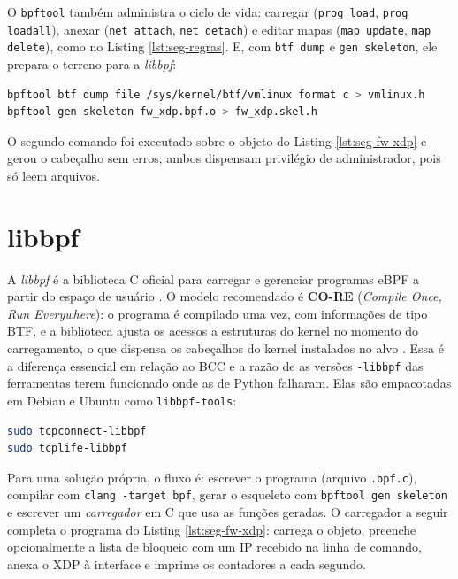 O \texttt{bpftool} também administra o ciclo de vida: carregar (\texttt{prog load},
\texttt{prog loadall}), anexar (\texttt{net attach}, \texttt{net detach}) e editar mapas
(\texttt{map update}, \texttt{map delete}), como no Listing \ref{lst:seg-regras}. E,
com \texttt{btf dump} e \texttt{gen skeleton}, ele prepara o terreno para a \textit{libbpf}:

\begin{lstlisting}[language=bash, caption={Geração de vmlinux.h e do esqueleto (skeleton) com bpftool.}, label=lst:ferr-bpftool-gen]
bpftool btf dump file /sys/kernel/btf/vmlinux format c > vmlinux.h
bpftool gen skeleton fw_xdp.bpf.o > fw_xdp.skel.h
\end{lstlisting}

O segundo comando foi executado sobre o objeto do Listing \ref{lst:seg-fw-xdp} e
gerou o cabeçalho sem erros; ambos dispensam privilégio de administrador, pois só
leem arquivos.

\section{libbpf}

A \textit{libbpf} é a biblioteca C oficial para carregar e gerenciar programas eBPF a
partir do espaço de usuário \cite{libbpf, nakryiko2020}. O modelo recomendado é
\textbf{CO-RE} (\textit{Compile Once, Run Everywhere}): o programa é compilado uma vez,
com informações de tipo BTF, e a biblioteca ajusta os acessos a estruturas do kernel
no momento do carregamento, o que dispensa os cabeçalhos do kernel instalados no alvo
\cite{nakryiko2020}. Essa é a diferença essencial em relação ao BCC e a razão de as
versões \texttt{-libbpf} das ferramentas terem funcionado onde as de Python
falharam. Elas são empacotadas em Debian e Ubuntu como \texttt{libbpf-tools}:

\begin{lstlisting}[language=bash, caption={Ferramentas de rede da libbpf-tools.}, label=lst:ferr-libbpf-tools]
sudo tcpconnect-libbpf
sudo tcplife-libbpf
\end{lstlisting}

Para uma solução própria, o fluxo é: escrever o programa (arquivo \texttt{.bpf.c}),
compilar com \texttt{clang -target bpf}, gerar o esqueleto com \texttt{bpftool gen
skeleton} e escrever um \textit{carregador} em C que usa as funções geradas. O
carregador a seguir completa o programa do Listing \ref{lst:seg-fw-xdp}: carrega o
objeto, preenche opcionalmente a lista de bloqueio com um IP recebido na linha de
comando, anexa o XDP à interface e imprime os contadores a cada segundo.


